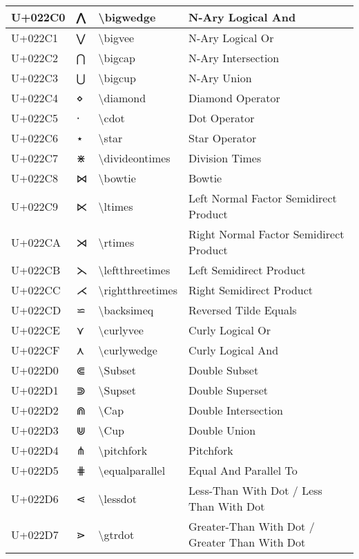 \begin{table}[h]
\begin{tabulary}{\linewidth}{|L|L|L|L|}
\hline
U+022C0 & ⋀ & {\textbackslash}bigwedge & N-Ary Logical And \\
\hline
U+022C1 & ⋁ & {\textbackslash}bigvee & N-Ary Logical Or \\
\hline
U+022C2 & ⋂ & {\textbackslash}bigcap & N-Ary Intersection \\
\hline
U+022C3 & ⋃ & {\textbackslash}bigcup & N-Ary Union \\
\hline
U+022C4 & ⋄ & {\textbackslash}diamond & Diamond Operator \\
\hline
U+022C5 & ⋅ & {\textbackslash}cdot & Dot Operator \\
\hline
U+022C6 & ⋆ & {\textbackslash}star & Star Operator \\
\hline
U+022C7 & ⋇ & {\textbackslash}divideontimes & Division Times \\
\hline
U+022C8 & ⋈ & {\textbackslash}bowtie & Bowtie \\
\hline
U+022C9 & ⋉ & {\textbackslash}ltimes & Left Normal Factor Semidirect Product \\
\hline
U+022CA & ⋊ & {\textbackslash}rtimes & Right Normal Factor Semidirect Product \\
\hline
U+022CB & ⋋ & {\textbackslash}leftthreetimes & Left Semidirect Product \\
\hline
U+022CC & ⋌ & {\textbackslash}rightthreetimes & Right Semidirect Product \\
\hline
U+022CD & ⋍ & {\textbackslash}backsimeq & Reversed Tilde Equals \\
\hline
U+022CE & ⋎ & {\textbackslash}curlyvee & Curly Logical Or \\
\hline
U+022CF & ⋏ & {\textbackslash}curlywedge & Curly Logical And \\
\hline
U+022D0 & ⋐ & {\textbackslash}Subset & Double Subset \\
\hline
U+022D1 & ⋑ & {\textbackslash}Supset & Double Superset \\
\hline
U+022D2 & ⋒ & {\textbackslash}Cap & Double Intersection \\
\hline
U+022D3 & ⋓ & {\textbackslash}Cup & Double Union \\
\hline
U+022D4 & ⋔ & {\textbackslash}pitchfork & Pitchfork \\
\hline
U+022D5 & ⋕ & {\textbackslash}equalparallel & Equal And Parallel To \\
\hline
U+022D6 & ⋖ & {\textbackslash}lessdot & Less-Than With Dot / Less Than With Dot \\
\hline
U+022D7 & ⋗ & {\textbackslash}gtrdot & Greater-Than With Dot / Greater Than With Dot \\

\end{tabulary}
\end{table}

